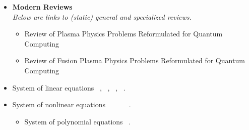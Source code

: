 \documentclass[12pt,letterpaper]{article}
\begin{document}
\begin{itemize}

	\item \textbf{Modern Reviews}
		\\\textit{Below are links to (static) general and specialized reviews.}
		\begin{itemize}
			\item Review of Plasma Physics Problems Reformulated for Quantum Computing ~\cite{dodin2020applications}
            \item Review of Fusion Plasma Physics Problems Reformulated for Quantum Computing\cite{josephQuantumComputingFusion2022}
		\end{itemize}
  
    
	\item System of linear equations ~\cite{bravo-prieto_variational_2020,huang_near-term_2019,xu_variational_2021},  ~\cite{harrowQuantumAlgorithmLinear2009,claderPreconditionedQuantumLinear2013,childsQuantumAlgorithmSystems2017,wangEfficientQuantumAlgorithms2022},  ~\cite{borleHowViableQuantum2022},  ~\cite{shaoFasterQuantuminspiredAlgorithms2021}.
 
	\item System of nonlinear equations ~\cite{Lubasch2020_PhysRevA.101.010301} ~ ~\cite{dodin2021quantum} ~\cite{xueQuantumNewtonMethod2021,xueQuantumAlgorithmSolving2022}.
		\begin{itemize}
			\item System of polynomial equations  ~\cite{changQuantumAnnealingSystems2019}.
		\end{itemize}
  

\end{itemize}
\end{document}
